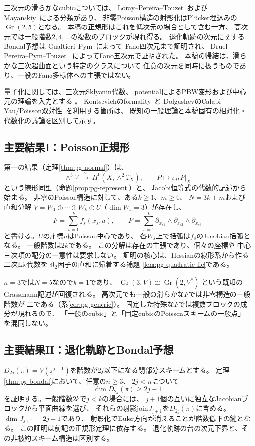 三次元の滑らかなcubicについては、
Loray--Pereira--Touzet~\cite{LPTPoissonCubic}および
Mayanskiy~\cite[Theorem~1]{PMayanskiy}による分類があり、
非零Poisson構造の射影化はPl\"ucker埋込みの
$\operatorname{Gr}(2,5)$となる。
本稿の正規形はこれを低次元の場合として含む一方、
高次元では一般階数$2,4,\ldots$の複数のブロックが現れ得る。
退化軌跡の次元に関するBondal予想は
Gualtieri--Pym~\cite{BondalGualtieriPym}によって
Fano四次元まで証明され、
Druel--Pereira--Pym--Touzet~\cite{BondalDruelPereiraPymTouzet}
によってFano五次元で証明された。
本稿の帰結は、滑らかな三次超曲面という特定のクラスについて
任意の次元を同時に扱うものであり、一般のFano多様体への主張ではない。

量子化に関しては、三次元Sklyanin代数、
potentialによるPBW変形および中心元の理論を入力とする
\cite{PMoriSmith,PBergerTaillefer,EG,SmithTate}。
Kontsevichのformality~\cite{PKontsevich}と
DolgushevのCalabi--Yau/Poisson双対性~\cite{PDolgushev}を利用する箇所は、
既知の一般理論と本稿固有の相対化・代数化の議論を区別して示す。

\subsection*{主要結果I：Poisson正規形}
第一の結果（定理\ref{thm:pg-normal}）は、
\[
 \wedge^3V\ \xrightarrow{\;\sim\;}\ 
 H^0(X,\wedge^2T_X),\qquad
 P\longmapsto \iota_{dF}P|_X
\]
という線形同型（命題\ref{prop:pg-represent}）と、
Jacobi恒等式の代数的記述から始まる。
非零のPoisson構造に対して、ある$k\geq1$、$m\geq0$、
$N=3k+m$および直和分解
$V=W_1\oplus\cdots\oplus W_k\oplus U$（$\dim W_s=3$）が存在し、
\[
 F=\sum_{s=1}^k f_s(x_s,u),\qquad
 P=\sum_{s=1}^k
 \partial_{x_{s1}}\wedge\partial_{x_{s2}}\wedge\partial_{x_{s3}}
\]
と書ける。$U$の座標$u$はPoisson中心であり、
各$W_s$上で括弧は$f_s$のJacobian括弧となる。
一般階数は$2k$である。
この分解は存在の主張であり、個々の座標や
中心三次項の配分の一意性は要求しない。
証明の核心は、Hessianの線形系から作る二次Lie代数を
$\mathfrak{sl}_2$因子の直和に帰着する補題
\ref{lem:pg-quadratic-lie}である。

$n=3$では$N=5$なので$k=1$であり、
$\operatorname{Gr}(3,V)\cong\operatorname{Gr}(2,V^*)$
という既知のGrassmann記述が回復される。
高次元でも一般の滑らかな$F$では非零構造の一般階数が
二である（系\ref{cor:pg-generic}）。
固定した特殊な$F$では複数ブロックの成分が現れるので、
「一般のcubic」と「固定cubicのPoissonスキームの一般点」を混同しない。

\subsection*{主要結果II：退化軌跡とBondal予想}
$D_{2j}(\pi)=V(\pi^{j+1})$を階数が$2j$以下になる閉部分スキームとする。
定理\ref{thm:pg-bondal}において、任意の$n\geq3$、
$2j<n$について
\[
 \dim D_{2j}(\pi)\geq 2j+1
\]
を証明する。一般階数$2k$で$j<k$の場合には、
$j+1$個の互いに独立なJacobianブロックから平面曲線を選び、
それらの射影join$J_{j+1}$を$D_{2j}(\pi)$に含める。
$\dim J_{j+1}=2j+1$であり、
射影化でEuler方向が消えることが階数低下の鍵となる。
この証明は前記の正規形定理に依存する。
退化軌跡の台の次元下界と、その非被約スキーム構造は区別する。

